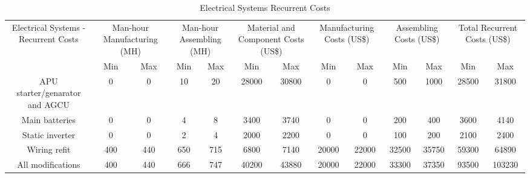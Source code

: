 \begin{table}[htbp]
  \centering
  \caption{Electrical Systems Recurrent Costs}
    \begin{tabular}{ccccccccccccc}
    \toprule
    \multirow{2}[4]{*}{Electrical Systems - Recurrent Costs} & \multicolumn{2}{c}{Man-hour Manufacturing (MH)} & \multicolumn{2}{c}{Man-hour Assembling (MH)} & \multicolumn{2}{c}{Material and Component Costs (US\$)} & \multicolumn{2}{c}{Manufacturing Costs (US\$)} & \multicolumn{2}{c}{Assembling Costs (US\$)} & \multicolumn{2}{c}{Total Recurrent Costs (US\$)} \\
          & Min   & Max   & Min   & Max   & Min   & Max   & Min   & Max   & Min   & Max   & Min   & Max \\
    \midrule
    APU starter/genarator and AGCU & 0     & 0     & 10    & 20    & 28000 & 30800 & 0     & 0     & 500   & 1000  & 28500 & 31800 \\
    Main batteries & 0     & 0     & 4     & 8     & 3400  & 3740  & 0     & 0     & 200   & 400   & 3600  & 4140 \\
    Static inverter & 0     & 0     & 2     & 4     & 2000  & 2200  & 0     & 0     & 100   & 200   & 2100  & 2400 \\
    Wiring refit & 400   & 440   & 650   & 715   & 6800  & 7140  & 20000 & 22000 & 32500 & 35750 & 59300 & 64890 \\
    All modifications & 400   & 440   & 666   & 747   & 40200 & 43880 & 20000 & 22000 & 33300 & 37350 & 93500 & 103230 \\
    \bottomrule
    \end{tabular}%
  \label{tab:EleSysRecCost}%
\end{table}%